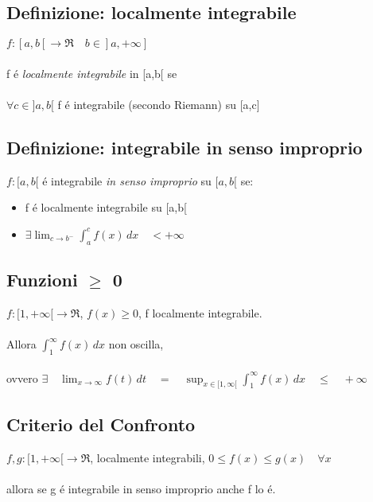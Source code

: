 \documentclass[a4paper,10pt,italian]{article}
\begin{document}
\subsection{Definizione: localmente integrabile}
$f:[a,b[ \rightarrow \Re \quad b\in ]a, +\infty]$ \\ \\
f \'e \emph{localmente integrabile} in [a,b[ se \\ \\
$\forall c \in ]a,b[$ f \'e integrabile (secondo Riemann) su [a,c]

\subsection{Definizione: integrabile in senso improprio}
$f:[a,b[$ \'e integrabile \emph{in senso improprio} su $[a,b[$ se: 
\begin{itemize}
\item f \'e localmente integrabile su [a,b[
\item $\exists \lim_{c\rightarrow b^-} \int_{a}^{c}f(x)\,dx \quad < +\infty$
\end{itemize}

\subsection{Funzioni $\geq$ 0}
$f:[1, +\infty[\rightarrow \Re$, $f(x)\geq 0$, f localmente integrabile. \\ \\
Allora $\int_{1}^{\infty}f(x)\,dx$ non oscilla, \\ \\
ovvero $\exists \quad \lim_{x \rightarrow \infty}f(t)\,dt \quad =\quad \sup_{x\in [1, \infty[} \int_{1}^{\infty} f(x)\,dx \quad\leq \quad +\infty$

\subsection{Criterio del Confronto}
$f,g:[1, +\infty[\rightarrow \Re$, localmente integrabili, $0 \leq f(x)\leq g(x) \quad \forall x$ \\ \\
allora se g \'e integrabile in senso improprio anche f lo \'e.
\end{document}
